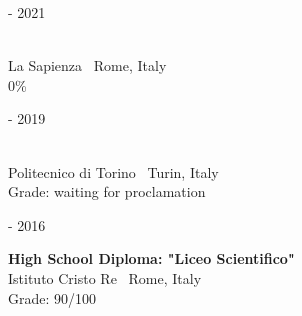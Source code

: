 \begin{minipage}{.3\textwidth}
	 - 2021 \faCalendar
\end{minipage}
\hfill
\begin{minipage}{.65\textwidth}
	\vfill
	 \\
	\color{Maroon} La Sapienza \hfill \color{Sepia} \faMapMarker \ Rome, Italy \\
	\color{gray} 0\%
	\vfill
\end{minipage}

\bigskip

\begin{minipage}{.3\textwidth}
	 - 2019 \faCalendar
\end{minipage}
\hfill
\begin{minipage}{.65\textwidth}
	\vfill
	 \\
	\color{Maroon} Politecnico di Torino \hfill \color{Sepia} \faMapMarker \ Turin, Italy \\
	\color{gray} Grade: waiting for proclamation
	\vfill
\end{minipage}

\bigskip

\begin{minipage}{.3\textwidth}
	 - 2016 \faCalendar
\end{minipage}
\hfill
\begin{minipage}{.64\textwidth}
	\vfill
	{\large \textbf{High School Diploma: "Liceo Scientifico"}} \\
	\color{Maroon} Istituto Cristo Re \hfill \color{Sepia} \faMapMarker \ Rome, Italy \\
	\color{gray} Grade: 90/100
	\vfill
\end{minipage}